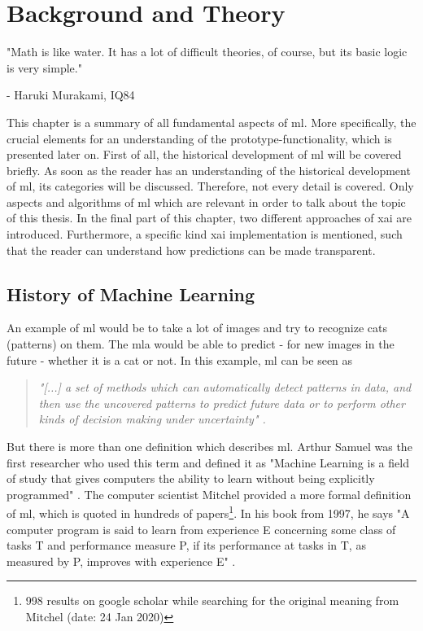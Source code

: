 \chapter{Background and Theory}
\label{ch:theory}
\epigraph{"Math is like water. It has a lot of difficult theories, of course, but its basic logic is very simple."}{- Haruki Murakami, IQ84}

This chapter is a summary of all fundamental aspects of \gls{ml}. More specifically, the crucial elements for an understanding of the prototype-functionality, which is presented later on. First of all, the historical development of \gls{ml} will be covered briefly. As soon as the reader has an understanding of the historical development of \gls{ml}, its categories will be discussed. Therefore, not every detail is covered. Only aspects and algorithms of \gls{ml} which are relevant in order to talk about the topic of this thesis. In the final part of this chapter, two different approaches of \gls{xai} are introduced. Furthermore, a specific kind 
\gls{xai} implementation is mentioned, such that the reader can understand how predictions can be made transparent.

\section{History of Machine Learning}
\label{sec:history}

An example of \Gls{ml} would be to take a lot of images and try to recognize cats (patterns) on them. The \Gls{mla} would be able to predict - for new images in the future - whether it is a cat or not. In this example, \gls{ml} can be seen as

\begin{quote}\textit{"[...] a set of methods which can automatically detect patterns in data, and then use the uncovered patterns to predict future data or to perform other kinds of decision making under uncertainty" \cite[p. 1]{Murphy2012}.} \end{quote}

But there is more than one definition which describes \gls{ml}. Arthur Samuel was the first researcher who used this term and defined it as "Machine Learning is a field of study that gives computers the ability to learn without being explicitly programmed" \cite{Samuel1959SomeSI}. The computer scientist Mitchel provided a more formal definition of \gls{ml}, which is quoted in hundreds of papers\footnote{998 results on google scholar while searching for the original meaning from Mitchel (date: 24 Jan 2020)}. In his book from 1997, he says "A computer program is said to learn from experience E concerning some class of tasks T and performance measure P, if its performance at tasks in T, as measured by P, improves with experience E" \cite{Mitchell97}.\\

